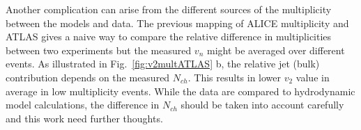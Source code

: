 Another complication can arise from the different sources of the multiplicity between the models and data.  The previous mapping of ALICE multiplicity and ATLAS gives a naive way to compare the relative difference in multiplicities between two experiments but the measured $v_n$ might be averaged over different events. As illustrated in Fig.~\ref{fig:v2multATLAS} b, the relative jet (bulk) contribution depends on the measured $N_{ch}$. This results in lower $v_2$ value in average in low multiplicity events. While the data are compared to hydrodynamic model calculations, the difference in $N_{ch}$ should be taken into account carefully and this work need further thoughts.